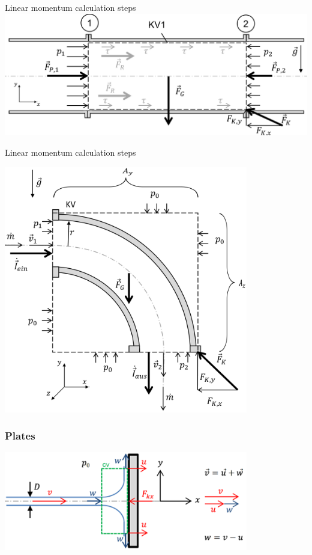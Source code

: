 \documentclass{article}
\begin{document}
\begin{multicols}{2}
\begin{examplebox}{Linear momentum calculation steps}
    \includegraphics[width=\textwidth]{media/CV1.png}
\end{examplebox}
\vfill
\end{multicols}

\newpage
\begin{multicols}{2}
\setlength{\columnsep}{1pt}
\begin{examplebox}{Linear momentum calculation steps}
    \begin{center}
        \includegraphics[width=0.8\textwidth]{media/Impuls_Kruemmer.png}
    \end{center}

    \subsubsection{Plates}
    \begin{center}
        \includegraphics[width=0.8\textwidth]{media/platte_bewegt.png}
    \end{center}
\end{examplebox}


\end{multicols}
\end{document}
